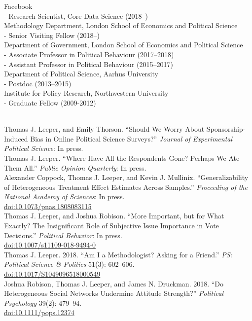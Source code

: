 \documentclass[12pt]{article}
\renewcommand{\section}[1]{\pagebreak[3]%
    \llap{\scshape\smash{\parbox[t]{\marginparwidth}{\raggedright {\color{lg}#1}}}}%
    \vspace{-\baselineskip}\par}
\newcommand{\topic}[1]{\pagebreak[3]\indent {\color{lg}{\footnotesize #1 }}\\}
\newcommand{\entry}[1]{\indent {\color{lg}\guillemotright}\hspace{2pt}#1\vspace{.25em}\\}
\newcommand{\subentry}[1]{{\color{lg}-} #1\vspace{.25em}\\}
\begin{document}
\section{Academic Appointments}
\entry{Facebook}
	\subentry{Research Scientist, Core Data Science (2018--)}
\entry{Methodology Department, London School of Economics and Political Science}
	\subentry{Senior Visiting Fellow (2018--)}
\entry{Department of Government, London School of Economics and Political Science}
	\subentry{Associate Professor in Political Behaviour (2017--2018)}
	\subentry{Assistant Professor in Political Behaviour (2015--2017)}
\entry{Department of Political Science, Aarhus University}
	\subentry{Postdoc (2013--2015)}
\entry{Institute for Policy Research, Northwestern University}
	\subentry{Graduate Fellow (2009-2012)}

\section{Publications}
\topic{Peer-Reviewed Publications}
	\entry{Thomas J. Leeper, and Emily Thorson. ``Should We Worry About Sponsorship-Induced Bias in Online Political Science Surveys?'' \textit{Journal of Experimental Political Science}: In press.}
    \entry{Thomas J. Leeper. ``Where Have All the Respondents Gone? Perhaps We Ate Them All.'' \textit{Public Opinion Quarterly}: In press.}
    \entry{Alexander Coppock, Thomas J. Leeper, and Kevin J. Mullinix. ``Generalizability of Heterogeneous Treatment Effect Estimates Across Samples.'' \textit{Proceeding of the National Academy of Sciences}: In press.\\ \href{https://doi.org/10.1073/pnas.1808083115}{doi:10.1073/pnas.1808083115}}
	\entry{Thomas J. Leeper, and Joshua Robison. ``More Important, but for What Exactly? The Insignificant Role of Subjective Issue Importance in Vote Decisions.'' \textit{Political Behavior}: In press.\\ \href{https://doi.org/10.1007/s11109-018-9494-0}{doi:10.1007/s11109-018-9494-0}}
    \entry{Thomas J. Leeper. 2018. ``Am I a Methodologist? Asking for a Friend.'' \textit{PS: Political Science \& Politics} 51(3): 602--606.\\ \href{https://doi.org/10.1017/S1049096518000549}{doi:10.1017/S1049096518000549}}
	\entry{Joshua Robison, Thomas J. Leeper, and James N. Druckman. 2018. ``Do Heterogeneous Social Networks Undermine Attitude Strength?'' \textit{Political Psychology} 39(2): 479--94.\\ \href{http://doi.org/10.1111/pops.12374}{doi:10.1111/pops.12374}}
\end{document}
